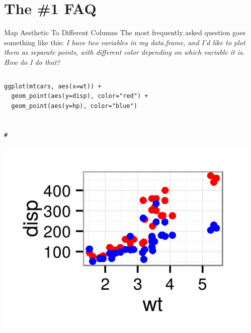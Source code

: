 \documentclass[table,smaller]{beamer}
\begin{document}
\section{The \#1 FAQ}
\label{sec-7}
\begin{frame}[fragile,label=sec-7-1]{Map Aesthetic To Different Columns}
 The most frequently asked question goes something like this: \emph{I have two variables in my data.frame, and I'd like to plot them as separate points, with different color depending on which variable it is. How do I do that?}
\begin{columns}
\begin{column}{0.5\textwidth}

\begin{columns}  \begin{block}{}

\begin{verbatim}
ggplot(mtcars, aes(x=wt)) +
  geom_point(aes(y=disp), color="red") +
  geom_point(aes(y=hp), color="blue")


#
\end{verbatim}

\includegraphics[width=.9\linewidth]{images/WrongWayNoMelt.png}

\end{block} \end{columns}
\end{column}

\begin{column}{0.5\textwidth}

\begin{columns}  \begin{block}{}


\end{block}
\end{columns}
\end{column}
\end{columns}
\end{frame}
\end{document}
